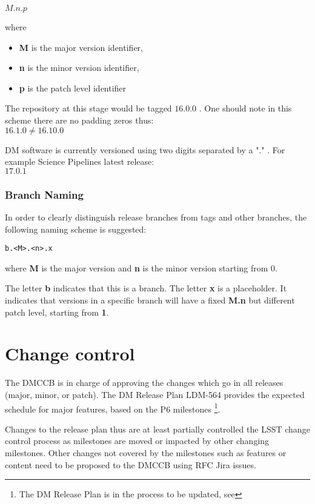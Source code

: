 $M.n.p$

where

\begin{itemize}
\item \textbf{M} is the major version identifier,
\item \textbf{n} is the minor version identifier,
\item \textbf{p} is the patch level identifier
\end{itemize}

The repository at this stage would be tagged $16.0.0$ .
One should note in this scheme there are no padding zeros thus:
\\
$16.1.0   \neq 16.10.0$

DM software is currently versioned using two digits separated by a "." .
For example Science Pipelines latest release:\\
$17.0.1$


\subsubsection{Branch Naming} \label{sec:branchnaming}

In order to clearly distinguish release branches from tags and other branches, the following naming scheme is suggested:

\begin{verbatim}
b.<M>.<n>.x
\end{verbatim}

where \textbf{M} is the major version and \textbf{n} is the minor version starting from 0.

The letter  \textbf{b} indicates that this is a branch.
The letter \textbf{x} is a placeholder. It indicates that versions in a specific branch will have a fixed \textbf{M.n} but different patch level, starting from \textbf{1}.


\newpage
\section{Change control} \label{sec:changecontrol}

The DMCCB is in charge of approving the changes which go in all releases (major, minor, or patch).
The DM Release Plan LDM-564 provides the expected schedule for major features, based on the P6 milestones \footnote{The DM Release Plan is in the process to be updated, see }.

Changes to the release plan thus are at least partially controlled the LSST change control process as milestones are moved or impacted by other changing milestones. Other changes not covered by the milestones such as features or content need to be proposed to the DMCCB using RFC Jira issues.

